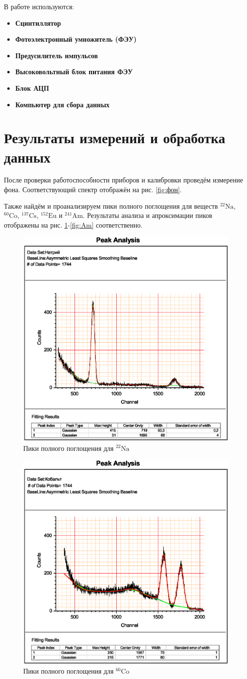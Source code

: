 \documentclass[a4paper]{article}
\newcommand{\isotope}[2]{$ ^{#2}\mathrm{#1} $}
\newcommand{\equip}[1]{
	
	\item{\bf #1}}
\begin{document}
В работе используются:
\begin{itemize}
	\equip{Сцинтиллятор}
	\equip{Фотоэлектронный умножитель (ФЭУ)}
	\equip{Предусилитель импульсов}
	\equip{Высоковольтный блок питания ФЭУ}
	\equip{Блок АЦП}
	\equip{Компьютер для сбора данных}
\end{itemize}

\section{Результаты измерений и обработка данных}

После проверки работоспособности приборов и калибровки проведём измерение фона. Соответствующий спектр отображён на рис. \ref{fig:фон}.

Также найдём и проанализируем пики полного поглощения для веществ \isotope{Na}{22}, \isotope{Co}{60}, \isotope{Cs}{137}, \isotope{Eu}{152} и \isotope{Am}{241}. Результаты анализа и апроксимации пиков отображены на рис. \ref{fig:Na}-\ref{fig:Am} соответственно.
\begin{figure}
	\centering
	\includegraphics[width=0.7\linewidth]{"1"}
	\caption{Пики полного поглощения для \isotope{Na}{22}}
	\label{fig:Na}
\end{figure}
\begin{figure}
	\centering
	\includegraphics[width=0.7\linewidth]{"2"}
	\caption{Пики полного поглощения для \isotope{Co}{60}}
	\label{fig:Co}
\end{figure}
\end{document}
